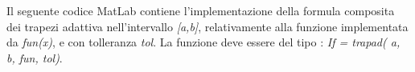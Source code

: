 Il seguente codice MatLab contiene l'implementazione della formula composita dei trapezi adattiva nell'intervallo \textit{[a,b]}, relativamente alla funzione implementata da \textit{fun(x)}, e con tolleranza \textit{tol}. La funzione deve essere del tipo : \textit{If = trapad( a, b, fun, tol)}.\\\
